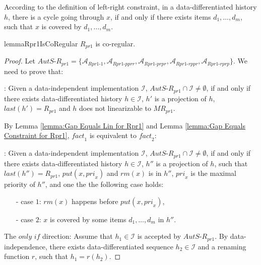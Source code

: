 According to the definition of left-right constraint, in a data-differentiated history $h$, there is a cycle going through $x$, if and only if there exists items $d_1,\ldots,d_m$, such that $x$ is covered by $d_1,\ldots,d_m$.



\begin{restatable}{lemma}{Rpr1IsCoRegular}
\label{lemma:Rpr1 is co-regular}
$R_{\textit{pr1}}$ is co-regular.
\end{restatable}

\begin {proof}

Let $\textit{AutS-R}_{\textit{pr1}} = \{ \mathcal{A}_{\textit{Rpr1-1}} , \mathcal{A}_{\textit{Rpr1-pprr}}, \mathcal{A}_{\textit{Rpr1-prpr}}, \mathcal{A}_{\textit{Rpr1-rppr}}, \mathcal{A}_{\textit{Rpr1-rprp}} \}$. We need to prove that:

: Given a data-independent implementation $\mathcal{I}$, $\textit{AutS-R}_{\textit{pr1}} \cap \mathcal{I} \neq \emptyset$, if and only if there exists data-differentiated history $h \in \mathcal{I}$, $h'$ is a projection of $h$, $\textit{last}(h') = R_{\textit{pr1}}$ and $h$ does not linearizable to $\textit{MR}_{\textit{pr1}}$.

By Lemma \ref{lemma:Gap Equals Lin for Rpr1} and Lemma \ref{lemma:Gap Equals Constraint for Rpr1}, $\textit{fact}_1$ is equivalent to $\textit{fact}_2$:

: Given a data-independent implementation $\mathcal{I}$, $\textit{AutS-R}_{\textit{pr1}} \cap \mathcal{I} \neq \emptyset$, if and only if there exists data-differentiated history $h \in \mathcal{I}$, $h''$ is a projection of $h$, such that $\textit{last}(h'') = R_{\textit{pr1}}$, $\textit{put}(x,\textit{pri}_x)$ and $\textit{rm}(x)$ is in $h''$, $\textit{pri}_x$ is the maximal priority of $h''$, and one the the following case holds:

\begin{itemize}
\setlength{\itemsep}{0.5pt}
\item[-] case $1$: $\textit{rm}(x)$ happens before $\textit{put}(x,\textit{pri}_x)$,
\item[-] case $2$: $x$ is covered by some items $d_1,\ldots,d_m$ in $h''$.
\end{itemize}

\noindent The $\textit{only if}$ direction: Assume that $h_1 \in \mathcal{I}$ is accepted by $\textit{AutS-R}_{\textit{pr1}}$. By data-independence, there exists data-differentiated sequence $h_2 \in \mathcal{I}$ and a renaming function $r$, such that $h_1=r(h_2)$.


\end{proof}
